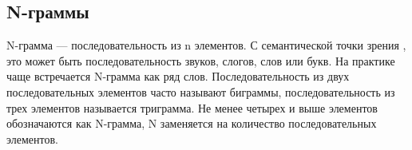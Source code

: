 \subsection{N-граммы}
N-грамма — последовательность из n элементов. С семантической точки зрения
, это может быть последовательность звуков, слогов, слов или букв. На практике 
чаще встречается N-грамма как ряд слов. Последовательность из двух последовательных 
элементов часто называют биграммы, последовательность из трех элементов 
называется триграмма. Не менее четырех и выше элементов обозначаются как 
N-грамма, N заменяется на количество последовательных элементов.

